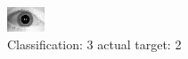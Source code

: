 \begin{figure}[h!]
\begin{center}
\includegraphics[width=0.60\columnwidth]{figures/ID1785_class_3_target_2.png}
\end{center}
\caption{ Classification: 3 actual target: 2}
\label{fig:ID1785_class_3_target_2}
\end{figure}
